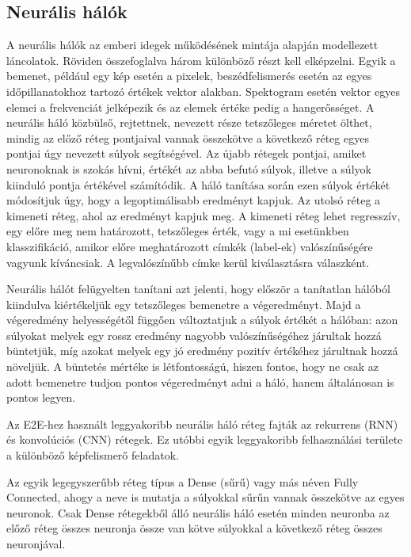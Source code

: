 
\subsection{Neurális hálók}

A neurális hálók az emberi idegek működésének mintája alapján modellezett láncolatok. Röviden összefoglalva három különböző részt kell elképzelni. Egyik a bemenet, például egy kép esetén a pixelek, beszédfelismerés esetén az egyes időpillanatokhoz tartozó értékek vektor alakban. Spektogram esetén vektor egyes elemei a frekvenciát jelképezik és az elemek értéke pedig a hangerősséget. A neurális háló közbülső, rejtettnek, nevezett része tetszőleges méretet ölthet, mindig az előző réteg pontjaival vannak összekötve a következő réteg egyes pontjai úgy nevezett súlyok segítségével. Az újabb rétegek pontjai, amiket neuronoknak is szokás hívni, értékét az abba befutó súlyok, illetve a súlyok kiinduló pontja értékével számítódik. A háló tanítása során ezen súlyok értékét módosítjuk úgy, hogy a legoptimálisabb eredményt kapjuk. Az utolsó réteg a kimeneti réteg, ahol az eredményt kapjuk meg. A kimeneti réteg lehet regresszív, egy előre meg nem határozott, tetszőleges érték, vagy a mi esetünkben klasszifikáció, amikor előre meghatározott címkék (label-ek) valószínűségére vagyunk kíváncsiak. A legvalószínűbb címke kerül kiválasztásra válaszként.

Neurális hálót felügyelten tanítani azt jelenti, hogy először a tanítatlan hálóból kiindulva kiértékeljük egy tetszőleges bemenetre a végeredményt. Majd a végeredmény helyességétől függően változtatjuk a súlyok értékét a hálóban: azon súlyokat melyek egy rossz eredmény nagyobb valószínűségéhez járultak hozzá büntetjük, míg azokat melyek egy jó eredmény pozitív értékéhez járultnak hozzá növeljük. A büntetés mértéke is létfontosságú, hiszen fontos, hogy ne csak az adott bemenetre tudjon pontos végeredményt adni a háló, hanem általánosan is pontos legyen. 

Az E2E-hez használt leggyakoribb neurális háló réteg fajták az rekurrens (RNN) és konvolúciós (CNN) rétegek. Ez utóbbi egyik leggyakoribb felhasználási területe a különböző képfelismerő feladatok.

Az egyik legegyszerűbb réteg típus a Dense (sűrű) vagy más néven Fully Connected, ahogy a neve is mutatja a súlyokkal sűrűn vannak összekötve az egyes neuronok. Csak Dense rétegekből álló neurális háló esetén minden neuronba az előző réteg összes neuronja össze van kötve súlyokkal a következő réteg összes neuronjával.

